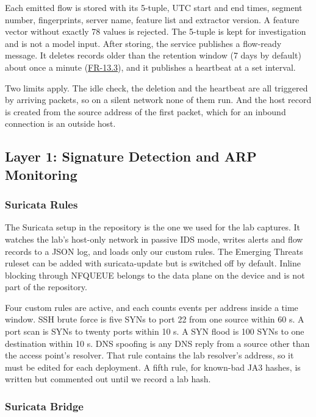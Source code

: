 \noindent Each emitted flow is stored with its 5-tuple, UTC start and end times, segment number, fingerprints, server name, feature list and extractor version. A feature vector without exactly 78 values is rejected. The 5-tuple is kept for investigation and is not a model input. After storing, the service publishes a flow-ready message. It deletes records older than the retention window (7 days by default) about once a minute (\hyperlink{req:FR-13.3}{FR-13.3}), and it publishes a heartbeat at a set interval.

\noindent Two limits apply. The idle check, the deletion and the heartbeat are all triggered by arriving packets, so on a silent network none of them run. And the host record is created from the source address of the first packet, which for an inbound connection is an outside host.

\subsection{Layer 1: Signature Detection and ARP Monitoring}\label{sec:7.1.6}

\subsubsection{Suricata Rules}\label{sec:7.1.6.1}

\noindent The Suricata setup in the repository is the one we used for the lab captures. It watches the lab's host-only network in passive IDS mode, writes alerts and flow records to a JSON log, and loads only our custom rules. The Emerging Threats ruleset can be added with suricata-update but is switched off by default. Inline blocking through NFQUEUE belongs to the data plane on the device and is not part of the repository.

\noindent Four custom rules are active, and each counts events per address inside a time window. SSH brute force is five SYNs to port 22 from one source within 60 s. A port scan is SYNs to twenty ports within 10 s. A SYN flood is 100 SYNs to one destination within 10 s. DNS spoofing is any DNS reply from a source other than the access point's resolver. That rule contains the lab resolver's address, so it must be edited for each deployment. A fifth rule, for known-bad JA3 hashes, is written but commented out until we record a lab hash.

\subsubsection{Suricata Bridge}\label{sec:7.1.6.2}

